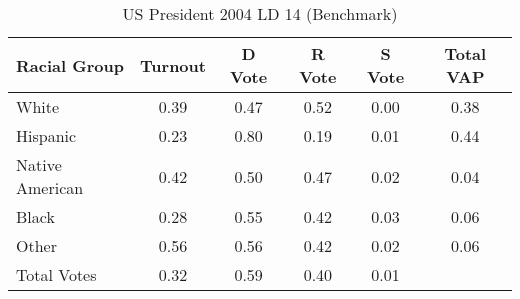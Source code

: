 \begin{table}[htb]
\begin{center}
\caption{US President 2004 LD 14 (Benchmark)}
\label{pres04_vap_ld_14_benchmark}
\begin{tabular}{lccccc}
  \hline
Racial Group & Turnout & D Vote & R Vote & S Vote & Total VAP \\ 
  \hline
White & 0.39 & 0.47 & 0.52 & 0.00 & 0.38 \\ 
  Hispanic & 0.23 & 0.80 & 0.19 & 0.01 & 0.44 \\ 
  Native American & 0.42 & 0.50 & 0.47 & 0.02 & 0.04 \\ 
  Black & 0.28 & 0.55 & 0.42 & 0.03 & 0.06 \\ 
  Other & 0.56 & 0.56 & 0.42 & 0.02 & 0.06 \\ 
  Total Votes & 0.32 & 0.59 & 0.40 & 0.01 &  \\ 
   \hline
\end{tabular}
\end{center}
\end{table}
